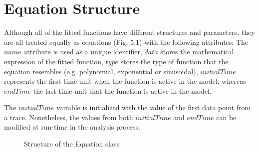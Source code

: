 \section{Equation Structure}
Although all of the fitted functions have different structures and parameters, they are all treated equally as equations (Fig. 5.1) with the following attributes:
%
The $name$ attribute is used as a unique identifier, $data$ stores the mathematical expression of the fitted function, $type$ stores the type of function that the equation resembles (e.g. polynomial, exponential or sinusoidal),
%
$initialTime$ represents the first time unit when the function is active in the model, 
%
whereas $endTime$ the last time unit that the function is active in the model.
%
\begin{remark}
	The $initialTime$ variable is initialized with the value of the first data point from a trace. Nonetheless, the values from both $initialTime$ and $endTime$ can be modified at run-time in the analysis process. 
\end{remark}

\begin{figure}[b]
	\label{EquationsStructure}
	\centering
	\caption{Structure of the Equation class}
\end{figure}
%
